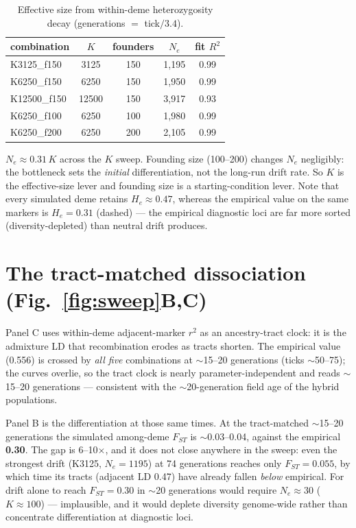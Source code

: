 \documentclass[11pt,a4paper]{article}
\begin{document}
\begin{table}[h]\centering
\caption{Effective size from within-deme heterozygosity decay (generations $=$ tick$/3.4$).}
\label{tab:ne}
\begin{tabular}{lcccc}
\toprule
combination & $K$ & founders & $N_e$ & fit $R^2$ \\
\midrule
K3125\_f150  & 3125  & 150 & 1{,}195 & 0.99 \\
K6250\_f150  & 6250  & 150 & 1{,}950 & 0.99 \\
K12500\_f150 & 12500 & 150 & 3{,}917 & 0.93 \\
K6250\_f100  & 6250  & 100 & 1{,}980 & 0.99 \\
K6250\_f200  & 6250  & 200 & 2{,}105 & 0.99 \\
\bottomrule
\end{tabular}
\end{table}

$N_e \approx 0.31\,K$ across the $K$ sweep. Founding size (100--200) changes $N_e$
negligibly: the bottleneck sets the \emph{initial} differentiation, not the long-run
drift rate. So $K$ is the effective-size lever and founding size is a starting-condition
lever. Note that every simulated deme retains $H_e \approx 0.47$, whereas the empirical
value on the same markers is $H_e = 0.31$ (dashed) --- the empirical diagnostic loci are
far more sorted (diversity-depleted) than neutral drift produces.

\section{The tract-matched dissociation (Fig.~\ref{fig:sweep}B,C)}
Panel C uses within-deme adjacent-marker $r^2$ as an ancestry-tract clock: it is the
admixture LD that recombination erodes as tracts shorten. The empirical value (0.556) is
crossed by \emph{all five} combinations at $\sim$15--20 generations (ticks $\sim$50--75);
the curves overlie, so the tract clock is nearly parameter-independent and reads
$\sim$15--20 generations --- consistent with the $\sim$20-generation field age of the
hybrid populations.

Panel B is the differentiation at those same times. At the tract-matched
$\sim$15--20 generations the simulated among-deme $F_{ST}$ is $\sim$0.03--0.04, against
the empirical \textbf{0.30}. The gap is 6--10$\times$, and it does not close anywhere in
the sweep: even the strongest drift (K3125, $N_e = 1195$) at 74 generations reaches only
$F_{ST} = 0.055$, by which time its tracts (adjacent LD 0.47) have already fallen
\emph{below} empirical. For drift alone to reach $F_{ST} = 0.30$ in $\sim$20 generations
would require $N_e \approx 30$ ($K \approx 100$) --- implausible, and it would deplete
diversity genome-wide rather than concentrate differentiation at diagnostic loci.
\end{document}

